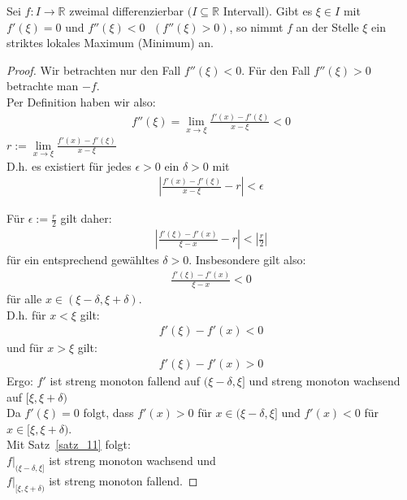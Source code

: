 \begin{Satz}{
	Sei $f: I \rightarrow \mathbb{R}$ zweimal differenzierbar $(I \subseteq 
	\mathbb{R}$ Intervall$)$. Gibt es $\xi \in I$ mit $f'(\xi) = 0$ und 
	$f''(\xi) < 0 \textbf{ }  (f''(\xi)> 0)$, so nimmt $f$ an der Stelle $\xi$ ein 
	striktes lokales Maximum (Minimum) an.
}\end{Satz}

\begin{proof}
	Wir betrachten nur den Fall $f''(\xi) < 0$. Für den Fall
	$f''(\xi) > 0$ betrachte man $-f$.\\
	Per Definition haben wir also: 
	\begin{align*}
		f''(\xi) = \lim\limits_{x \rightarrow \xi}{\frac{f'(x) - f'(\xi)}{x - \xi} }
		< 0
	\end{align*}
	$r := \lim\limits_{x \rightarrow \xi}{\frac{f'(x) - f'(\xi)}{x - \xi} } $ \\
	D.h. es existiert für jedes $ \epsilon > 0$ ein $\delta > 0$ mit
	\begin{align*}
		\left\vert \frac{f'(x) - f'(\xi)}{x - \xi} - r \right\vert < \epsilon
	\end{align*}
	
	Für $\epsilon := \frac{r}{2}$ gilt daher: 
	\begin{align*}
		\left\vert \frac{f'(\xi) - f'(x)}{\xi - x}-r \right\vert < \left\vert \frac{r}{2} \right\vert
	\end{align*}
	für ein entsprechend gewähltes $\delta > 0$. Insbesondere gilt also:
	\begin{align*}
		\frac{f'(\xi)-f'(x)}{\xi - x} < 0
	\end{align*}
	für alle $ x \in ( \xi - \delta, \xi + \delta)$.\\
	D.h. für $x < \xi$ gilt: 
	\begin{align*}
		f'(\xi) - f'(x) < 0
	\end{align*}
	und für $ x > \xi$ gilt: 
	\begin{align*}
		f'(\xi) - f'(x) > 0
	\end{align*}
	Ergo: $f'$ ist streng monoton fallend auf $(\xi - \delta, \xi]$ und 
	streng monoton wachsend auf $[ \xi, \xi + \delta)$ \\
	Da $f'(\xi) = 0$ folgt, dass $f'(x) > 0$ für $x \in (\xi-\delta, \xi]$
	und $f'(x) <0 $ für $x \in [\xi, \xi + \delta)$.\\
	  Mit Satz~\ref{satz_11} folgt: \\
	  	\hspace*{5mm}$f|_{(\xi-\delta, \xi]}$ ist streng monoton wachsend und \\
	  	\hspace*{5mm}$f|_{[\xi, \xi + \delta)}$ ist streng monoton fallend.
\end{proof}

